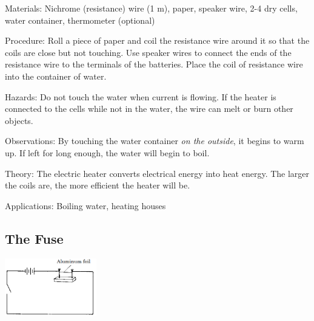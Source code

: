 \begin{multicols}{2}
\begin{description*}
\item[Materials:]{Nichrome (resistance) wire (1 m), paper, speaker wire, 2-4 dry cells, water container, thermometer (optional)}
\item[Procedure:]{Roll a piece of paper and coil the resistance wire around it so that the coils are close but not touching. Use speaker wires to connect the ends of the resistance wire to the terminals of the batteries. Place the coil of resistance wire into the container of water.}
\item[Hazards:]{Do not touch the water when current is flowing. If the heater is connected to the cells while not in the water, the wire can melt or burn other objects.}
\item[Observations:]{By touching the water container \emph{on the outside}, it begins to warm up. If left for long enough, the water will begin to boil.}
\item[Theory:]{The electric heater converts electrical energy into heat energy. The larger the coils are, the more efficient the heater will be.}
\item[Applications:]{Boiling water, heating houses}
\end{description*}

\subsection{The Fuse} 

\begin{center}
\includegraphics[width=0.3\textwidth]{./img/source/fuse.png}
\end{center}


\end{multicols}
